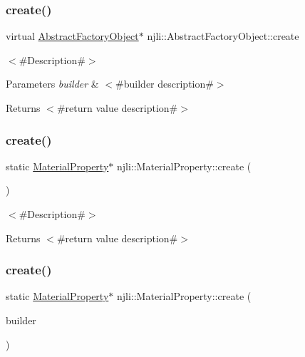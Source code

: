 \subsubsection{\texorpdfstring{create()}{create()}\hspace{0.1cm}{\footnotesize\ttfamily [1/3]}}
{\footnotesize\ttfamily virtual \mbox{\hyperlink{classnjli_1_1_abstract_factory_object}{Abstract\+Factory\+Object}}$\ast$ njli\+::\+Abstract\+Factory\+Object\+::create}

$<$\#\+Description\#$>$


\begin{DoxyParams}{Parameters}
{\em builder} & $<$\#builder description\#$>$\\
\hline
\end{DoxyParams}
\begin{DoxyReturn}{Returns}
$<$\#return value description\#$>$ 
\end{DoxyReturn}
\mbox{\label{classnjli_1_1_material_property_ab7a5e5535ed79f6ac2c86c8b78214007}} 
\subsubsection{\texorpdfstring{create()}{create()}\hspace{0.1cm}{\footnotesize\ttfamily [2/3]}}
{\footnotesize\ttfamily static \mbox{\hyperlink{classnjli_1_1_material_property}{Material\+Property}}$\ast$ njli\+::\+Material\+Property\+::create (\begin{DoxyParamCaption}{ }\end{DoxyParamCaption})\hspace{0.3cm}{\ttfamily [static]}}

$<$\#\+Description\#$>$

\begin{DoxyReturn}{Returns}
$<$\#return value description\#$>$ 
\end{DoxyReturn}
\mbox{\label{classnjli_1_1_material_property_a030ee6b5b94ec745e83b044ccc6906ff}} 
\subsubsection{\texorpdfstring{create()}{create()}\hspace{0.1cm}{\footnotesize\ttfamily [3/3]}}
{\footnotesize\ttfamily static \mbox{\hyperlink{classnjli_1_1_material_property}{Material\+Property}}$\ast$ njli\+::\+Material\+Property\+::create (\begin{DoxyParamCaption}\item[{const \mbox{\hyperlink{classnjli_1_1_material_property_builder}{Material\+Property\+Builder}} \&}]{builder }\end{DoxyParamCaption})\hspace{0.3cm}{\ttfamily [static]}}

